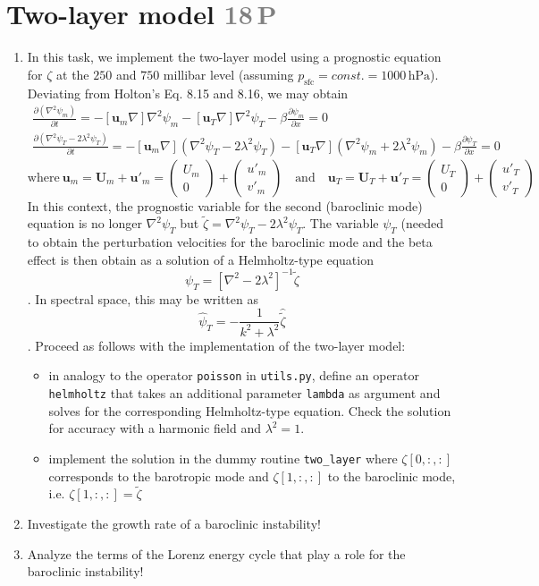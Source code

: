 \documentclass[jobname=project, 10pt]{article}
\newcommand{\p}{\partial}       %
\renewcommand{\vec}[1]{\mathbf{#1}}
\newcommand{\task}[2]{\section{#1 \hfill \normalsize\normalfont \textcolor{gray}{#2\,P}}\addtocounter{ptot}{#2}}
\newcounter{ptot}
\begin{document}
\task{Two-layer model}{18}
\begin{enumerate}[label=\alph*)]
\item In this task, we implement the two-layer model using a prognostic equation for $\zeta$ at the $250$ and $750$ millibar level (assuming $p_\text{sfc}=const.=1000\,\mathrm{hPa}$). Deviating from Holton's Eq. 8.15 and 8.16, we may obtain
  \begin{eqnarray*}
    \frac{\p (\nabla^2\psi_m)}{\p t} = 
    -\left[\vec{u}_m \nabla\right] \nabla^2\psi_m - \left[{\vec{u}}_T\nabla\right] \nabla^2\psi_T - \beta \frac{\p \psi_m}{\p x}= 0\\
 \frac{\p \left( \nabla^2 \psi_T - 2\lambda^2 \psi_T\right)}{\p t} =  -\left[ \vec{u}_m\nabla \right] \left( \nabla^2\psi_T - 2\lambda^2 \psi_T\right) - \left[\vec{u}_T \nabla \right] \left(\nabla^2\psi_m + 2\lambda^2\psi_m  \right) - \beta \frac{\p \psi_T}{\p x} = 0 
  \end{eqnarray*}
  \[\text{where} \ \vec{u}_m = \vec{U}_m + {\vec{u}'}_m = \begin{pmatrix} U_m\\0\end{pmatrix} + \begin{pmatrix}{u'}_m\\ {v'}_m\end{pmatrix} \quad \text{and} \quad \vec{u}_T = \vec{U}_T + {\vec{u}'}_T = \begin{pmatrix} U_T \\ 0 \end{pmatrix} + \begin{pmatrix} {u'}_T \\{v'}_T \end{pmatrix} \]
  In this context, the prognostic variable for the second (baroclinic mode) equation is no longer $\nabla^2\psi_T$ but $\tilde{\zeta} = \nabla^2\psi_T - 2\lambda^2 \psi_T$. The variable $\psi_T$ (needed to obtain the perturbation velocities for the baroclinic mode and the beta effect is then obtain as a solution of a Helmholtz-type equation
  \[\psi_T = \left[ \nabla^2 -2\lambda^2 \right]^{-1}  \tilde{\zeta}\].
  In spectral space, this may be written as
  \[ \hat{\psi}_T = -\frac{1}{ k^2 + \lambda^2 } \widehat{\tilde{\zeta}}\].
  Proceed as follows with the implementation of the two-layer model:
  \begin{itemize}
  \item in analogy to the operator \texttt{poisson} in \texttt{utils.py}, define an operator \texttt{helmholtz} that takes an additional parameter \texttt{lambda} as argument and solves for the corresponding Helmholtz-type equation. Check the solution for accuracy with a harmonic field and $\lambda^2=1$.
  \item implement the solution in the dummy routine \texttt{two\_layer} where $\zeta[0,:,:]$ corresponds to the barotropic mode and $\zeta[1,:,:]$ to the baroclinic mode, i.e. $\zeta[1,:,:] = \tilde{\zeta}$
  \end{itemize} 
\item Investigate the growth rate of a baroclinic instability!
\item Analyze the terms of the Lorenz energy cycle that play a role for the baroclinic instability!
\end{enumerate}
\end{document}
